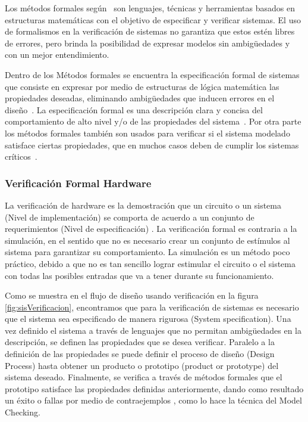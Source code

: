 Los m\'etodos formales seg\'un~\cite{Clarke1996} son lenguajes, t\'ecnicas y 
herramientas basados en estructuras matem\'aticas con el objetivo de especificar 
y verificar sistemas. El uso de formalismos en la verificaci\'on de sistemas no 
garantiza que estos est\'en libres de errores, pero brinda la posibilidad de 
expresar modelos sin ambig\"uedades y con un mejor entendimiento.

Dentro de los M\'etodos formales se encuentra la especificaci\'on formal de 
sistemas que consiste en expresar por medio de estructuras de l\'ogica 
matem\'atica las propiedades deseadas, eliminando ambig\"uedades que inducen 
errores en el dise\~no~\cite{Clarke1996}. La especificaci\'on formal es 
una descripci\'on clara y concisa del comportamiento de alto nivel y/o de las 
propiedades del sistema~\cite{Kropf1999}. Por otra parte los m\'etodos 
formales tambi\'en son usados para verificar si el sistema modelado satisface 
ciertas propiedades, que en muchos casos deben de cumplir los sistemas 
cr\'iticos~\cite{Clarke1996}.

\subsubsection{Verificaci\'on Formal Hardware}

La verificaci\'on de hardware es la demostraci\'on que un circuito o un sistema 
(Nivel de implementaci\'on) se comporta de acuerdo a un conjunto de 
requerimientos (Nivel de especificaci\'on) \cite{Kropf1999}. La 
verificaci\'on formal es contraria a la simulaci\'on, en el sentido que no es 
necesario crear un conjunto de est\'imulos al sistema para garantizar su 
comportamiento. La simulaci\'on es un m\'etodo poco pr\'actico, debido a que no 
es tan sencillo lograr estimular el circuito o el sistema con todas las posibles 
entradas que va a tener durante su funcionamiento. 

Como se muestra en el flujo de dise\~no usando verificaci\'on en la figura 
\ref{fig:sisVerificacion}, encontramos que para la verificaci\'on de sistemas 
es necesario que el sistema sea especificado de manera rigurosa (System 
specification). Una vez definido el sistema a trav\'es de lenguajes que no 
permitan ambig\"uedades en la descripci\'on,  se definen las propiedades que se 
desea verificar. Paralelo a la definici\'on de las propiedades se puede definir 
el proceso de dise\~no (Design Process) hasta obtener un producto o prototipo 
(product or prototype) del sistema deseado. Finalmente, se verifica a trav\'es 
de m\'etodos formales que el prototipo satisface las propiedades definidas 
anteriormente, dando como resultado un \'exito o fallas por medio de 
contraejemplos \cite{Vaovic2005}, como lo hace la t\'ecnica del Model 
Checking.


